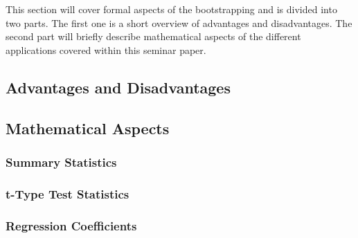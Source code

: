 This section will cover formal aspects of the bootstrapping and is divided into two parts. The first one is a short overview of advantages and disadvantages. The second part will briefly describe mathematical aspects of the different applications covered within this seminar paper. 

\subsection{Advantages and Disadvantages}

\subsection{Mathematical Aspects}
	\subsubsection*{Summary Statistics}
	\subsubsection*{t-Type Test Statistics}
	\subsubsection*{Regression Coefficients}
	
